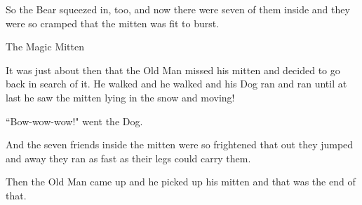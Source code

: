 \documentclass{article}
\begin{document}
So the Bear squeezed in, too, and now there were seven of them inside and they were so cramped that the mitten was fit to burst.

The Magic Mitten

It was just about then that the Old Man missed his mitten and decided to go back in search of it. He walked and he walked and his Dog ran and ran until at last he saw the mitten lying in the snow and moving!

``Bow-wow-wow!" went the Dog.

And the seven friends inside the mitten were so frightened that out they jumped and away they ran as fast as their legs could carry them.

Then the Old Man came up and he picked up his mitten and that was the end of that.
\end{document}
